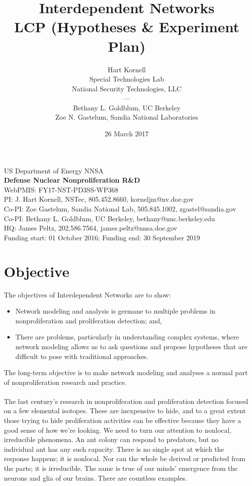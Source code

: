 \documentclass{article} %
\title{Interdependent Networks\\LCP (Hypotheses \& Experiment Plan)}
\author{Hart Kornell\\ Special Technologies Lab\\National Security Technologies, LLC\\
---\\
Bethany L. Goldblum, UC Berkeley\\
Zoe N. Gastelum, Sandia National Laboratories}
\date{26 March 2017}
\begin{document}
\maketitle

\vfill
\begin{center}
US Department of Energy NNSA \\
\textbf{Defense Nuclear Nonproliferation R\&D} \\
WebPMIS: FY17-NST-PD3SS-WP368  \\
PI: J. Hart Kornell, NSTec, 805.452.8660, korneljm@nv.doe.gov \\
Co-PI: Zoe Gastelum, Sandia National Lab, 505.845.1002, zgastel@sandia.gov \\
Co-PI: Bethany L. Goldblum, UC Berkeley, bethany@nuc.berkeley.edu \\
HQ: James Peltz, 202.586.7564, james.peltz@nnsa.doe.gov \\
Funding start: 01 October 2016; Funding end: 30 September 2019
\end{center}
\newpage
\thispagestyle{empty}
\mbox{}
\newpage

\newpage

\onehalfspace

\tableofcontents{}

\newpage
\thispagestyle{empty}
\mbox{}
\newpage

\section{Objective}
The objectives of Interdependent Networks are to show:
\renewcommand\labelitemi{\tiny$\bullet$}
\begin{itemize}
\item Network modeling and analysis is germane to multiple problems in nonproliferation and proliferation detection; and,
\item There are problems, particularly in understanding complex systems, where network modeling allows us to ask questions and propose hypotheses that are difficult to pose with traditional approaches.
\end{itemize}
The long-term objective is to make network modeling and analyses a normal part of nonproliferation research and practice.\\
\\
\noindent The last century's research in nonproliferation and proliferation detection focused on a few elemental isotopes. These are inexpensive to hide, and to a great extent those trying to hide proliferation activities can be effective because they have a good sense of how we're looking. We need to turn our attention to nonlocal, irreducible phenomena. An ant colony can respond to predators, but no individual ant has any such capacity. There is no single spot at which the response happens; it is nonlocal. Nor can the whole be derived or predicted from the parts; it is irreducible. The same is true of our minds' emergence from the neurons and glia of our brains. There are countless examples.  
\end{document}
